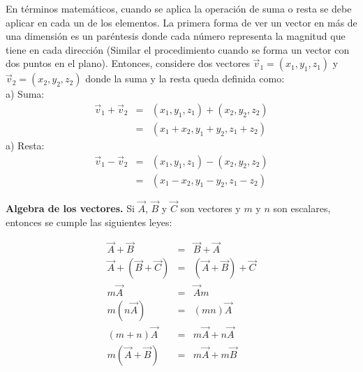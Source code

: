En términos matemáticos, cuando se aplica la operación de suma o resta se debe aplicar en cada un de los elementos. La primera forma de ver un vector en más de una dimensión es un paréntesis donde cada número representa la magnitud que tiene en cada dirección (Similar el procedimiento cuando se forma un vector con dos puntos en el plano). Entonces, considere dos vectores $\vec{v}_{1}=(x_{1},y_{1},z_{1})$ y $\vec{v}_{2}=(x_{2},y_{2},z_{2})$ donde la suma y la resta queda definida como:\\

\noindent a) Suma:\\
\begin{eqnarray}
\vec{v}_{1}+\vec{v}_{2}&=&(x_{1},y_{1},z_{1})+(x_{2},y_{2},z_{2})\\
&=&(x_{1}+x_{2},y_{1}+y_{2},z_{1}+z_{2})
\end{eqnarray}
\noindent a) Resta:\\
\begin{eqnarray}
\vec{v}_{1}-\vec{v}_{2}&=&(x_{1},y_{1},z_{1})-(x_{2},y_{2},z_{2})\\
&=&(x_{1}-x_{2},y_{1}-y_{2},z_{1}-z_{2})
\end{eqnarray}

\begin{mydef}
\textbf{Algebra de los vectores. }Si $\vec{A}$, $\vec{B}$ y $\vec{C}$ son vectores y $m$ y $n$ son escalares, entonces se cumple las siguientes leyes:
\end{mydef}
\begin{eqnarray}
\vec{A}+\vec{B}&=&\vec{B}+\vec{A}\\
\vec{A}+(\vec{B}+\vec{C})&=&(\vec{A}+\vec{B})+\vec{C}\\
m\vec{A}&=&\vec{A}m\\
m(n\vec{A})&=&(mn)\vec{A}\\
(m+n)\vec{A}&=&m\vec{A}+n\vec{A}\\
m(\vec{A}+\vec{B})&=&m\vec{A}+m\vec{B}
\end{eqnarray}

